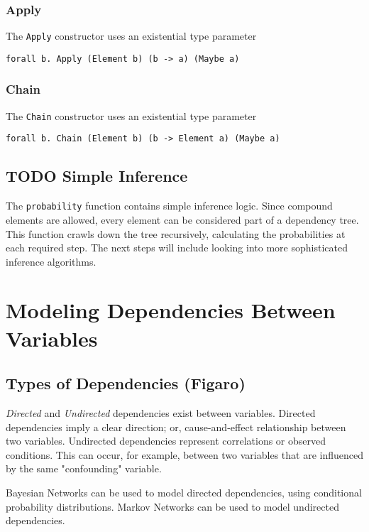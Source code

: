 \documentclass[11pt]{article}
\begin{document}
\subsubsection{Apply}
\label{sec-1-6-2}
The \texttt{Apply} constructor uses an existential type parameter
\begin{center}
\texttt{forall b. Apply (Element b) (b -> a) (Maybe a)}
\end{center}
\subsubsection{Chain}
\label{sec-1-6-3}
The \texttt{Chain} constructor uses an existential type parameter
\begin{center}
\texttt{forall b. Chain (Element b) (b -> Element a) (Maybe a)}
\end{center}



\subsection{{\bfseries\sffamily TODO} Simple Inference}
\label{sec-1-7}
The \texttt{probability} function contains simple inference logic. Since
compound elements are allowed, every element can be considered part of
a dependency tree. This function crawls down the tree recursively, calculating
the probabilities at each required step. The next steps will include looking
into more sophisticated inference algorithms.

\section{Modeling Dependencies Between Variables}
\label{sec-2}
\subsection{Types of Dependencies (Figaro)}
\label{sec-2-1}

\emph{Directed} and \emph{Undirected} dependencies exist between
variables. Directed dependencies imply a clear direction; or,
cause-and-effect relationship between two variables. Undirected
dependencies represent correlations or observed conditions. This
can occur, for example, between two variables that are influenced
by the same "confounding" variable.

Bayesian Networks can be used to model directed dependencies,
using conditional probability distributions. Markov Networks can
be used to model undirected dependencies.
\end{document}
